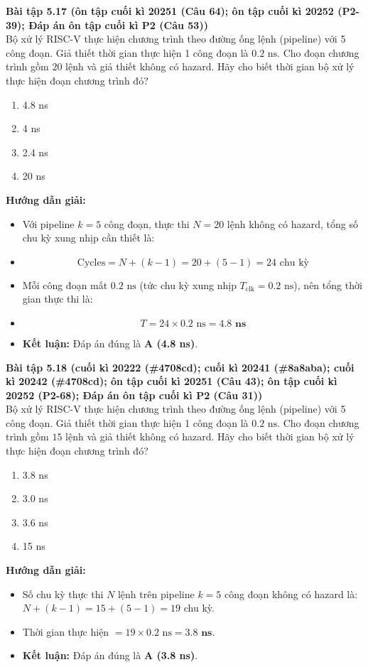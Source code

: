 \textbf{Bài tập 5.17 (ôn tập cuối kì 20251 (Câu 64); ôn tập cuối kì 20252 (P2-39); Đáp án ôn tập cuối kì P2 (Câu 53))}\\
Bộ xử lý RISC-V thực hiện chương trình theo đường ống lệnh (pipeline) với 5 công đoạn. Giả thiết thời gian thực hiện 1 công đoạn là $0.2\text{ ns}$. Cho đoạn chương trình gồm $20$ lệnh và giả thiết không có hazard. Hãy cho biết thời gian bộ xử lý thực hiện đoạn chương trình đó?
\begin{enumerate}[label=\Alph*.]
    \item 4.8 ns
    \item 4 ns
    \item 2.4 ns
    \item 20 ns
\end{enumerate}
\textbf{Hướng dẫn giải:}
\begin{itemize}
    \item Với pipeline $k = 5$ công đoạn, thực thi $N = 20$ lệnh không có hazard, tổng số chu kỳ xung nhịp cần thiết là:
    \item $$\text{Cycles} = N + (k - 1) = 20 + (5 - 1) = 24\text{ chu kỳ}$$
    \item Mỗi công đoạn mất $0.2\text{ ns}$ (tức chu kỳ xung nhịp $T_{\text{clk}} = 0.2\text{ ns}$), nên tổng thời gian thực thi là:
    \item $$T = 24 \times 0.2\text{ ns} = \mathbf{4.8\text{ ns}}$$
    \item \textbf{Kết luận:} Đáp án đúng là \textbf{A (4.8 ns)}.
\end{itemize}

\textbf{Bài tập 5.18 (cuối kì 20222 (\#4708cd); cuối kì 20241 (\#8a8aba); cuối kì 20242 (\#4708cd); ôn tập cuối kì 20251 (Câu 43); ôn tập cuối kì 20252 (P2-68); Đáp án ôn tập cuối kì P2 (Câu 31))}\\
Bộ xử lý RISC-V thực hiện chương trình theo đường ống lệnh (pipeline) với 5 công đoạn. Giả thiết thời gian thực hiện 1 công đoạn là $0.2\text{ ns}$. Cho đoạn chương trình gồm $15$ lệnh và giả thiết không có hazard. Hãy cho biết thời gian bộ xử lý thực hiện đoạn chương trình đó?
\begin{enumerate}[label=\Alph*.]
    \item 3.8 ns
    \item 3.0 ns
    \item 3.6 ns
    \item 15 ns
\end{enumerate}
\textbf{Hướng dẫn giải:}
\begin{itemize}
    \item Số chu kỳ thực thi $N$ lệnh trên pipeline $k = 5$ công đoạn không có hazard là: $N + (k - 1) = 15 + (5 - 1) = 19$ chu kỳ.
    \item Thời gian thực hiện $= 19 \times 0.2\text{ ns} = \mathbf{3.8\text{ ns}}$.
    \item \textbf{Kết luận:} Đáp án đúng là \textbf{A (3.8 ns)}.
\end{itemize}

